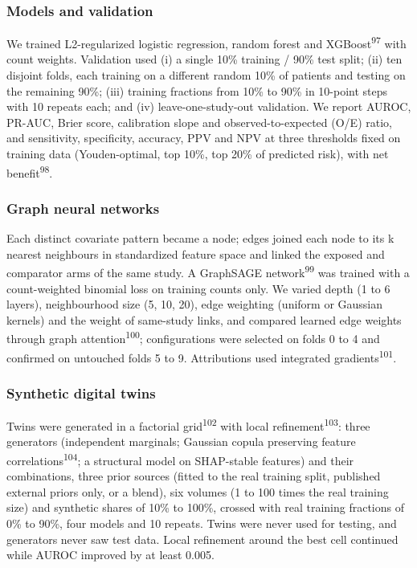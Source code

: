 \documentclass[
  11pt,
]{article}
\begin{document}
\subsubsection{Models and validation}\label{models-and-validation}

We trained L2-regularized logistic regression, random forest and
XGBoost\textsuperscript{97} with count weights. Validation used (i) a
single 10\% training / 90\% test split; (ii) ten disjoint folds, each
training on a different random 10\% of patients and testing on the
remaining 90\%; (iii) training fractions from 10\% to 90\% in 10-point
steps with 10 repeats each; and (iv) leave-one-study-out validation. We
report AUROC, PR-AUC, Brier score, calibration slope and
observed-to-expected (O/E) ratio, and sensitivity, specificity,
accuracy, PPV and NPV at three thresholds fixed on training data
(Youden-optimal, top 10\%, top 20\% of predicted risk), with net
benefit\textsuperscript{98}.

\subsubsection{Graph neural networks}\label{graph-neural-networks}

Each distinct covariate pattern became a node; edges joined each node to
its k nearest neighbours in standardized feature space and linked the
exposed and comparator arms of the same study. A GraphSAGE
network\textsuperscript{99} was trained with a count-weighted binomial
loss on training counts only. We varied depth (1 to 6 layers),
neighbourhood size (5, 10, 20), edge weighting (uniform or Gaussian
kernels) and the weight of same-study links, and compared learned edge
weights through graph attention\textsuperscript{100}; configurations
were selected on folds 0 to 4 and confirmed on untouched folds 5 to 9.
Attributions used integrated gradients\textsuperscript{101}.

\subsubsection{Synthetic digital twins}\label{synthetic-digital-twins}

Twins were generated in a factorial grid\textsuperscript{102} with local
refinement\textsuperscript{103}: three generators (independent
marginals; Gaussian copula preserving feature
correlations\textsuperscript{104}; a structural model on SHAP-stable
features) and their combinations, three prior sources (fitted to the
real training split, published external priors only, or a blend), six
volumes (1 to 100 times the real training size) and synthetic shares of
10\% to 100\%, crossed with real training fractions of 0\% to 90\%, four
models and 10 repeats. Twins were never used for testing, and generators
never saw test data. Local refinement around the best cell continued
while AUROC improved by at least 0.005.
\end{document}
